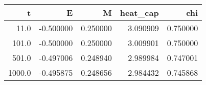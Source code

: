 \begin{tabular}{rrrrr}
\toprule
      t &         E &         M &  heat_cap &       chi \\
\midrule
   11.0 & -0.500000 &  0.250000 &  3.090909 &  0.750000 \\
  101.0 & -0.500000 &  0.250000 &  3.009901 &  0.750000 \\
  501.0 & -0.497006 &  0.248940 &  2.989984 &  0.747001 \\
 1000.0 & -0.495875 &  0.248656 &  2.984432 &  0.745868 \\
\bottomrule
\end{tabular}
